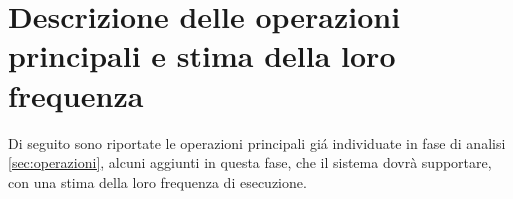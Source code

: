 \documentclass[a4paper,12pt]{report}
\begin{document}
\section{Descrizione delle operazioni principali e stima della loro frequenza}\label{sec:frequenza}
Di seguito sono riportate le operazioni principali giá individuate in fase di analisi \ref{sec:operazioni}, alcuni aggiunti in questa fase,
che il sistema dovrà supportare, con una stima della loro frequenza di esecuzione.
\end{document}
